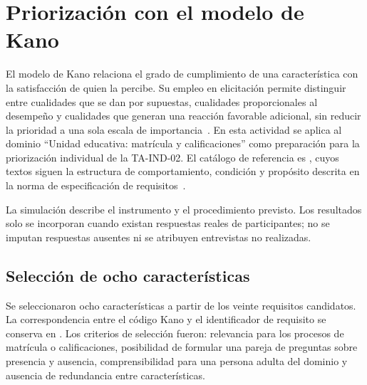 \section{Priorización con el modelo de Kano}
\label{sec:kano}

El modelo de Kano relaciona el grado de cumplimiento de una característica con la satisfacción de quien la percibe. Su empleo en elicitación permite distinguir entre cualidades que se dan por supuestas, cualidades proporcionales al desempeño y cualidades que generan una reacción favorable adicional, sin reducir la prioridad a una sola escala de importancia~\cite{pohl2025,wiegers2013,ireb2026}. En esta actividad se aplica al dominio ``Unidad educativa: matrícula y calificaciones'' como preparación para la priorización individual de la TA-IND-02. El catálogo de referencia es , cuyos textos siguen la estructura de comportamiento, condición y propósito descrita en la norma de especificación de requisitos~\cite{iso29148}.

La simulación describe el instrumento y el procedimiento previsto. Los resultados solo se incorporan cuando existan respuestas reales de participantes; no se imputan respuestas ausentes ni se atribuyen entrevistas no realizadas.

\subsection{Selección de ocho características}
\label{subsec:seleccion-kano}

Se seleccionaron ocho características a partir de los veinte requisitos candidatos. La correspondencia entre el código Kano y el identificador de requisito se conserva en . Los criterios de selección fueron: relevancia para los procesos de matrícula o calificaciones, posibilidad de formular una pareja de preguntas sobre presencia y ausencia, comprensibilidad para una persona adulta del dominio y ausencia de redundancia entre características.

